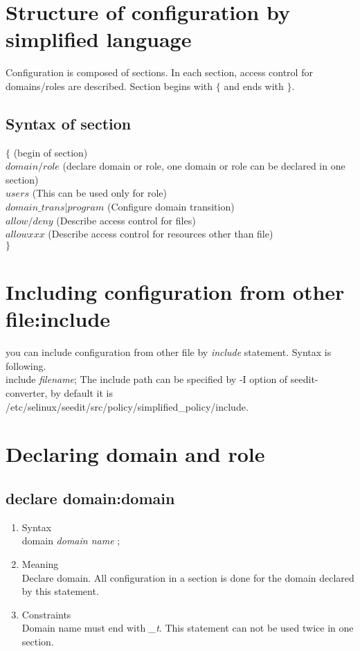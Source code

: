 \documentclass{article}
\begin{document}
\section{Structure of configuration by simplified language}
Configuration is composed of sections. In each section, access control for domains/roles are described. Section begins with $\{$ and ends with $\}$. 

\subsection{Syntax of section}

$\{$  (begin of section)\\
$domain/role$  (declare domain or role, one domain or role can be declared in one section) \\
$users$  (This can be used only for role)\\
$domain\_trans$|$program$ (Configure domain transition)\\
$allow/deny$  (Describe access control for files)\\
$allowxxx$   (Describe access control for resources other than file)\\
$\}$\\

\section{Including configuration from other file:include}
you can include configuration from other file by {\it include}
statement.
Syntax is following.\\
include {\it filename};
The include path can be specified by -I option of seedit-converter, by
default it is /etc/selinux/seedit/src/policy/simplified\_policy/include.


\section{Declaring domain and role}
\subsection{declare domain:domain}
\begin{enumerate}
 \item Syntax \\
      domain {\it domain name} ;
 \item Meaning\\
       Declare domain. All configuration in a section is done for
       the domain declared by this statement. 
 \item Constraints\\
Domain name must end with {\it \_t}. This statement can not be used twice in one section. 
\end{enumerate}
\end{document}
